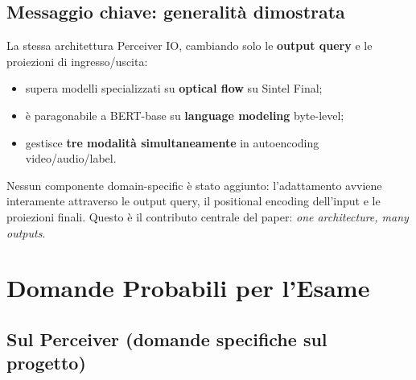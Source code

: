 \documentclass[
  11pt,
]{article}
\begin{document}
\subsection{Messaggio chiave: generalità dimostrata}

\begin{notabox}[title={\textbf{Generalità dimostrata dai numeri}}]
La stessa architettura Perceiver IO, cambiando solo le \textbf{output query} e le proiezioni di ingresso/uscita:
\begin{itemize}
  \item supera modelli specializzati su \textbf{optical flow} su Sintel Final;
  \item è paragonabile a BERT-base su \textbf{language modeling} byte-level;
  \item gestisce \textbf{tre modalità simultaneamente} in autoencoding video/audio/label.
\end{itemize}
Nessun componente domain-specific è stato aggiunto: l'adattamento avviene interamente attraverso le output query, il positional encoding dell'input e le proiezioni finali. Questo è il contributo centrale del paper: \emph{one architecture, many outputs}.
\end{notabox}

\section{Domande Probabili per l'Esame}

\subsection{Sul Perceiver (domande specifiche sul progetto)}
\end{document}
